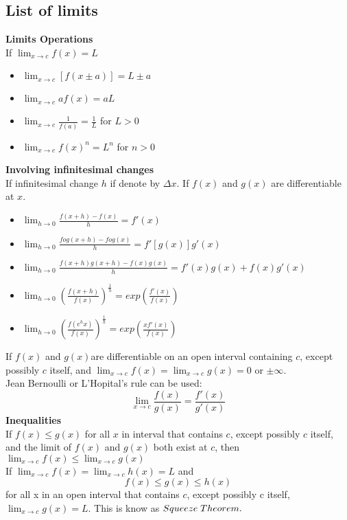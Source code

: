 \documentclass[twocolumn, 10pt]{article}
\begin{document}
\subsection{List of limits}
\textbf{Limits Operations} \\
If $\lim_{x \to c} f(x)=L$
\begin{itemize}
\item $\lim_{x \to c} [f(x \pm a)]=L \pm a$
\item $\lim_{x \to c} af(x)=aL$
\item $\lim_{x \to c} \frac{1}{f(a)}= \frac{1}{L}$ for $L>0$
\item $\lim_{x \to c} f(x)^n=L^n$ for $n>0$
\end{itemize}
\textbf{Involving infinitesimal changes} \\
If infinitesimal change $h$ if denote by $\Delta x$. If $f(x)$ and $g(x)$ are differentiable at $x$.
\begin{itemize}
\item $\lim_{h \to 0} \frac{f(x+h)-f(x)}{h}=f'(x)$
\item $\lim_{h \to 0} \frac{fog(x+h)-fog(x)}{h}=f'[g(x)]g'(x)$
\item $\lim_{h \to 0} \frac{f(x+h)g(x+h)-f(x)g(x)}{h}=f'(x)g(x)+f(x)g'(x)$
\item $\lim_{h \to 0}( \frac{f(x+h)}{f(x)} )^{\frac{1}{h}}=exp(\frac{f'(x)}{f(x)})$
\item $\lim_{h \to 0}( \frac{f(e^h x)}{f(x)} )^{\frac{1}{h}}=exp(\frac{xf'(x)}{f(x)})$
\end{itemize}
If $f(x)$ and $g(x) $are differentiable on an open interval containing $c$, except possibly $c$ itself, and $\lim_{x \to c} f(x)=\lim_{x \to c} g(x)=0$ or $\pm \infty$. \\ 
Jean Bernoulli or L'Hopital's rule can be used: $$\lim_{x \to c} \frac{f(x)}{g(x)}= \frac{f'(x)}{g'(x)}$$
\textbf{Inequalities} \\
If $f(x) \le g(x)$ for all $x$ in interval that contains $c$, except possibly $c$ itself, and the limit of $f(x)$ and $g(x)$ both exist at $c$, then $\lim_{x \to c} f(x) \le \lim_{x \to c} g(x) $ \\
If $\lim_{x \to c} f(x)= \lim_{x \to c} h(x)=L $ and $$f(x) \le g(x) \le h(x)$$ for all x in an open interval that contains $c$, except 
possibly c itself, $\lim_{x \to c} g(x)=L$. This is know as $Squeeze \thickspace Theorem.$
\end{document}
